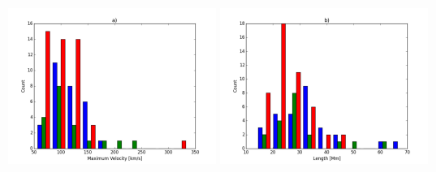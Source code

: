 \begin{figure}[t!]
	\centering
	\includegraphics[width=0.49\textwidth, height=0.24\textheight]{Chapter3/Figs/vel_hist.pdf}
	\includegraphics[width=0.49\textwidth, height=0.24\textheight]{Chapter3/Figs/len_hist.pdf}\\
	

\end{figure}

